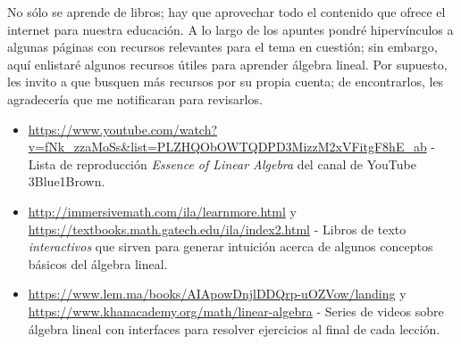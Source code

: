 \documentclass[12pt]{article}
\begin{document}
No sólo se aprende de libros; hay que aprovechar todo el contenido que ofrece el internet para nuestra educación. A lo largo de los apuntes pondré hipervínculos a algunas páginas con recursos relevantes para el tema en cuestión; sin embargo, aquí enlistaré algunos recursos útiles para aprender álgebra lineal. Por supuesto, les invito a que busquen más recursos por su propia cuenta; de encontrarlos, les agradecería que me notificaran para revisarlos.

\begin{itemize}
    \item \url{https://www.youtube.com/watch?v=fNk_zzaMoSs&list=PLZHQObOWTQDPD3MizzM2xVFitgF8hE_ab} - Lista de reproducción \textit{Essence of Linear Algebra} del canal de YouTube 3Blue1Brown.
    \item \url{http://immersivemath.com/ila/learnmore.html} y \url{https://textbooks.math.gatech.edu/ila/index2.html} - Libros de texto \emph{interactivos} que sirven para generar intuición acerca de algunos conceptos básicos del álgebra lineal.
    \item \url{https://www.lem.ma/books/AIApowDnjlDDQrp-uOZVow/landing} y \url{https://www.khanacademy.org/math/linear-algebra} - Series de videos sobre álgebra lineal con interfaces para resolver ejercicios al final de cada lección.
\end{itemize}

\newpage
\end{document}
